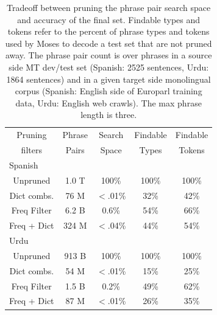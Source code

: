 \documentclass[11pt]{article}
\newcommand{\todo}[1]{\textcolor{red}{TODO: #1}}
\begin{document}
\begin{table}
\small
\begin{center}
\begin{tabular}{|c|c|c|c|c|}
\hline
Pruning 	& Phrase	& Search & 	Findable 	& Findable \\
filters	& Pairs	&  Space & Types 	&  Tokens \\
\hline
\hline
\multicolumn{5}{|l|}{Spanish} \\
\hline
Unpruned & 1.0 T & 100\% & 100\% & 100\% \\
Dict combs. & 76 M & $<$.01\% & 32\% & 42\% \\
Freq Filter &  6.2 B & 0.6\% & 54\% & 66\% \\
Freq + Dict & 324 M & $<$.04\% & 44\% & 54\% \\
\hline
\hline
\multicolumn{5}{|l|}{Urdu} \\
\hline
Unpruned & 913 B & 100\% & 100\% & 100\% \\
Dict combs. & 54 M & $<$.01\% & 15\% & 25\% \\
Freq Filter & 1.5 B & 0.2\% & 49\% & 62\% \\
Freq + Dict & 87 M & $<$.01\% & 26\% & 35\% \\
\hline
\end{tabular}
\caption{Tradeoff between pruning the phrase pair search space and accuracy of the final set. Findable types and tokens refer to the percent of phrase types and tokens used by Moses to decode a test set that are not pruned away. The phrase pair count is over phrases in a source side MT dev/test set (Spanish: 2525 sentences, Urdu: 1864 sentences) and in a given target side monolingual corpus (Spanish: English side of Europarl training data, Urdu: English web crawls). The max phrase length is three.}\label{table:prune}
\end{center}
\end{table}




\end{document}
